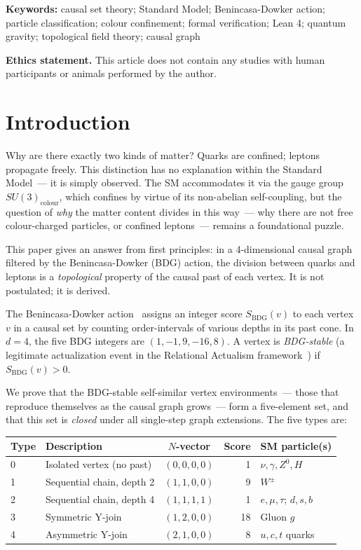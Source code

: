 \documentclass[11pt,a4paper]{article}
\newcommand{\SBDG}{S_{\mathrm{BDG}}}
\begin{document}
\noindent\textbf{Keywords:} causal set theory; Standard Model; Benincasa-Dowker action; particle classification; colour confinement; formal verification; Lean 4; quantum gravity; topological field theory; causal graph

\medskip
\noindent\textbf{Ethics statement.}
This article does not contain any studies with human participants
or animals performed by the author.



\section{Introduction}
\label{sec:intro}

Why are there exactly two kinds of matter? Quarks are confined; leptons
propagate freely. This distinction has no explanation within the Standard
Model~--- it is simply observed. The SM accommodates it via the gauge
group $SU(3)_{\mathrm{colour}}$, which confines by virtue of its
non-abelian self-coupling, but the question of \emph{why} the matter
content divides in this way~--- why there are not free colour-charged
particles, or confined leptons~--- remains a foundational puzzle.

This paper gives an answer from first principles: in a 4-dimensional
causal graph filtered by the Benincasa-Dowker (BDG) action, the division
between quarks and leptons is a \emph{topological} property of the
causal past of each vertex. It is not postulated; it is derived.

The Benincasa-Dowker action~\citep{Benincasa2010,Dowker2013} assigns an
integer score $\SBDG(v)$ to each vertex $v$ in a causal set by counting
order-intervals of various depths in its past cone. In $d=4$, the five
BDG integers are $(1,-1,9,-16,8)$. A vertex is \emph{BDG-stable}
(a legitimate actualization event in the Relational Actualism
framework~\citep{Sandeman2026RAQM}) if $\SBDG(v) > 0$.

We prove that the BDG-stable self-similar vertex environments~--- those
that reproduce themselves as the causal graph grows~--- form a
five-element set, and that this set is \emph{closed} under all
single-step graph extensions. The five types are:

\begin{center}
\renewcommand{\arraystretch}{1.25}
\begin{tabular}{llcrl}
\toprule
Type & Description & $N$-vector & Score & SM particle(s) \\
\midrule
0 & Isolated vertex (no past) & $(0,0,0,0)$ & 1 & $\nu,\gamma,Z^0,H$ \\
1 & Sequential chain, depth 2 & $(1,1,0,0)$ & 9 & $W^{\pm}$ \\
2 & Sequential chain, depth 4 & $(1,1,1,1)$ & 1 & $e,\mu,\tau$; $d,s,b$ \\
3 & Symmetric Y-join & $(1,2,0,0)$ & 18 & Gluon $g$ \\
4 & Asymmetric Y-join & $(2,1,0,0)$ & 8 & $u,c,t$ quarks \\
\bottomrule
\end{tabular}
\end{center}
\end{document}
